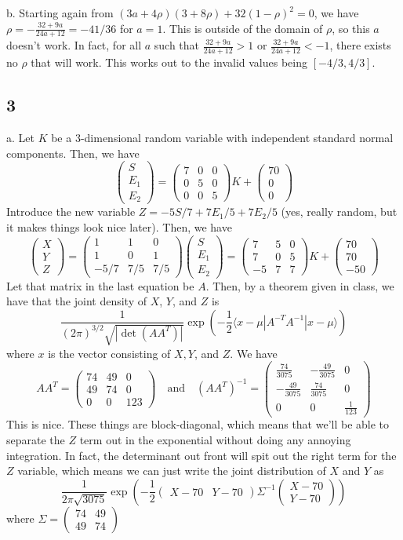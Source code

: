 \documentclass{article}
\newcommand{\openm}{\begin{pmatrix}}
\newcommand{\closem}{\end{pmatrix}}
\begin{document}
b. Starting again from $(3a+4\rho)(3+8\rho)+32(1-\rho)^2=0$, we have $\rho=-\frac{32+9a}{24a+12}=-41/36$ for $a=1$. This is outside of the domain of $\rho$, so this $a$ doesn't work. In fact, for all $a$ such that $\frac{32+9a}{24a+12}>1$ or $\frac{32+9a}{24a+12}<-1$, there exists no $\rho$ that will work. This works out to the invalid values being $[-4/3,4/3]$.
\subsection*{3}
a. Let $K$ be a 3-dimensional random variable with independent standard normal components. Then, we have 
$$\openm S\\E_1\\E_2\closem=\openm7&0&0\\0&5&0\\0&0&5\closem K+\openm70\\0\\0\closem$$
Introduce the new variable $Z=-5S/7+7E_1/5+7E_2/5$ (yes, really random, but it makes things look nice later). Then, we have 
$$\openm X\\Y\\Z\closem=\openm1&1&0\\1&0&1\\-5/7&7/5&7/5\closem\openm S\\E_1\\E_2\closem=\openm7&5&0\\7&0&5\\-5&7&7\closem K+\openm70\\70\\-50\closem$$
Let that matrix in the last equation be $A$. Then, by a theorem given in class, we have that the joint density of $X$, $Y$, and $Z$ is 
$$\frac{1}{(2\pi)^{3/2}\sqrt{|\det(AA^T)|}}\exp\left(-\frac{1}{2}\langle x-\mu|A^{-T}A^{-1}|x-\mu\rangle\right)$$
where $x$ is the vector consisting of $X,Y$, and $Z$. We have 
$$AA^T=\openm74&49&0\\49&74&0\\0&0&123\closem\quad\text{and}\quad (AA^T)^{-1}=\openm\frac{74}{3075}&-\frac{49}{3075}&0\\-\frac{49}{3075}&\frac{74}{3075}&0\\0&0&\frac{1}{123}\closem$$
This is nice. These things are block-diagonal, which means that we'll be able to separate the $Z$ term out in the exponential without doing any annoying integration. In fact, the determinant out front will spit out the right term for the $Z$ variable, which means we can just write the joint distribution of $X$ and $Y$ as 
$$\frac{1}{2\pi\sqrt{3075}}\exp\left(-\frac{1}{2}\openm X-70&Y-70\closem\Sigma^{-1}\openm X-70\\Y-70\closem\right)$$
where $\Sigma=\openm74&49\\49&74\closem$
\end{document}
